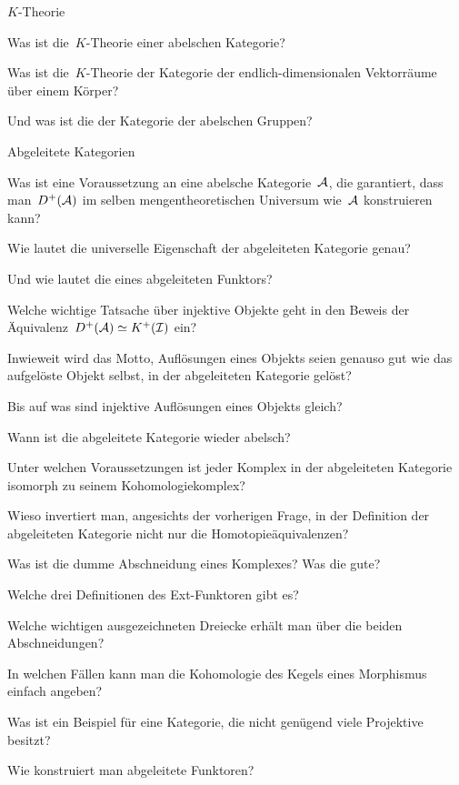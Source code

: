 \documentclass{uebblatt}
\begin{document}
\begin{aufgabeE}{$K$-Theorie}
\item Was ist die~$K$-Theorie einer abelschen Kategorie?
\item Was ist die~$K$-Theorie der Kategorie der endlich-dimensionalen
Vektorräume über einem Körper?
\item Und was ist die der Kategorie der abelschen Gruppen?
\end{aufgabeE}

\begin{aufgabeE}{Abgeleitete Kategorien}
\item Was ist eine Voraussetzung an eine abelsche Kategorie~$\mathcal{A}$, die
garantiert, dass man~$D^+(\mathcal{A})$ im selben mengentheoretischen Universum wie~$\mathcal{A}$
konstruieren kann?
\item Wie lautet die universelle Eigenschaft der abgeleiteten Kategorie
genau?
\item Und wie lautet die eines abgeleiteten Funktors?
\item Welche wichtige Tatsache über injektive Objekte geht in den Beweis der
Äquivalenz~$D^+(\mathcal{A}) \simeq K^+(\mathcal{I})$ ein?
\item Inwieweit wird das Motto, Auflösungen eines Objekts seien genauso gut wie
das aufgelöste Objekt selbst, in der abgeleiteten Kategorie gelöst?
\item Bis auf was sind injektive Auflösungen eines Objekts gleich?
\item Wann ist die abgeleitete Kategorie wieder abelsch?
\item Unter welchen Voraussetzungen ist jeder Komplex in der abgeleiteten
Kategorie isomorph zu seinem Kohomologiekomplex?
\item Wieso invertiert man, angesichts der vorherigen Frage, in der Definition
der abgeleiteten Kategorie nicht nur die Homotopieäquivalenzen?
\item Was ist die dumme Abschneidung eines Komplexes? Was die gute?
\item Welche drei Definitionen des Ext-Funktoren gibt es?
\item Welche wichtigen ausgezeichneten Dreiecke erhält man über die beiden
Abschneidungen?
\item In welchen Fällen kann man die Kohomologie des Kegels eines Morphismus
einfach angeben?
\item Was ist ein Beispiel für eine Kategorie, die nicht genügend viele
Projektive besitzt?
\item Wie konstruiert man abgeleitete Funktoren?
\end{aufgabeE}
\end{document}

